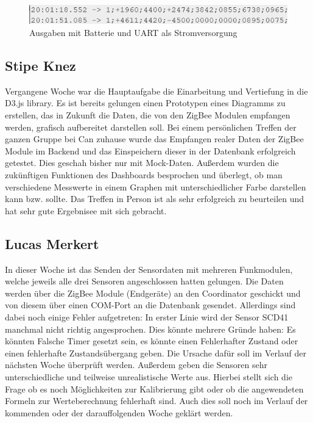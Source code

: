 \documentclass[]{article}
\begin{document}
\begin{figure}[!h]
	\centering
	\includegraphics[scale=0.80]{images/UART_fehler}
	\caption{Ausgaben mit Batterie und UART als Stromversorgung}
	\label{img:UART_fehler}
\end{figure}



\subsection{Stipe Knez}
Vergangene Woche war die Hauptaufgabe die Einarbeitung und Vertiefung in die D3.js library. Es ist bereits gelungen einen Prototypen eines Diagramms zu erstellen, das in Zukunft die Daten, die von den ZigBee Modulen empfangen werden, grafisch aufbereitet darstellen soll.
Bei einem persönlichen Treffen der ganzen Gruppe bei Can zuhause wurde das Empfangen realer Daten der ZigBee Module im Backend und das Einspeichern dieser in der Datenbank erfolgreich getestet. Dies geschah bisher nur mit Mock-Daten. Außerdem wurden die zukünftigen Funktionen des Dashboards besprochen und überlegt, ob man verschiedene Messwerte in einem Graphen mit unterschiedlicher Farbe darstellen kann bzw. sollte. Das Treffen in Person ist als sehr erfolgreich zu beurteilen und hat sehr gute Ergebnisee mit sich gebracht.
\subsection{Lucas Merkert}
In dieser Woche ist das Senden der Sensordaten mit mehreren Funkmodulen, welche jeweils alle drei Sensoren angeschlossen hatten gelungen. Die Daten werden über die ZigBee Module (Endgeräte) an den Coordinator geschickt und von diesem über einen COM-Port an die Datenbank gesendet. Allerdings sind dabei noch einige Fehler aufgetreten: In erster Linie wird der Sensor SCD41 manchmal nicht richtig angesprochen. Dies könnte mehrere Gründe haben: Es könnten Falsche Timer gesetzt sein, es könnte einen Fehlerhafter Zustand oder einen fehlerhafte Zustandsübergang geben. Die Ursache dafür soll im Verlauf der nächsten Woche überprüft werden. Außerdem geben die Sensoren sehr unterschiedliche und teilweise unrealistische Werte aus. Hierbei stellt sich die Frage ob es noch Möglichkeiten zur Kalibrierung gibt oder ob die angewendeten Formeln zur Werteberechnung fehlerhaft sind. Auch dies soll noch im Verlauf der kommenden oder der darauffolgenden Woche geklärt werden.
\end{document}
